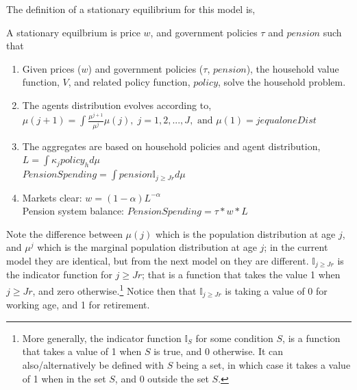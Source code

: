 The definition of a stationary equilibrium for this model is,
\begin{definition}
 A stationary equilbrium is price $w$, and government policies $\tau$ and $pension$ such that
 \begin{enumerate}
  \item Given prices ($w$) and government policies ($\tau$, $pension$), the household value function, $V$, and related policy function, $policy$, solve the household problem.
  \item The agents distribution evolves according to,
   \\  $\mu(j+1)=\int \frac{\mu^{j+1}}{\mu^j} \mu(j), \; j=1,2,...,J,\text{ and }\mu(1)=jequaloneDist$
  \item The aggregates are based on household policies and agent distribution,
   \\ $L=\int \kappa_j policy_h d\mu$
   \\ $PensionSpending=\int pension \mathbb{I}_{j\geq Jr} d\mu$
  \item Markets clear: $w=(1-\alpha)L^{-\alpha}$
   \\ Pension system balance: $PensionSpending=\tau*w*L$
 \end{enumerate}
\end{definition}
\noindent Note the difference between $\mu(j)$ which is the population distribution at age $j$, and $\mu^j$ which is the marginal population distribution at age $j$; in the current model they are identical, but from the next model on they are different. $\mathbb{I}_{j\geq Jr}$ is the indicator function for $j\geq Jr$; that is a function that takes the value 1 when $j\geq Jr$, and zero otherwise.\footnote{More generally, the indicator function $\mathbb{I}_S$ for some condition $S$, is a function that takes a value of 1 when $S$ is true, and $0$ otherwise. It can also/alternatively be defined with $S$ being a set, in which case it takes a value of 1 when in the set $S$, and $0$ outside the set $S$.} Notice then that $\mathbb{I}_{j\geq Jr}$ is taking a value of 0 for working age, and 1 for retirement.


